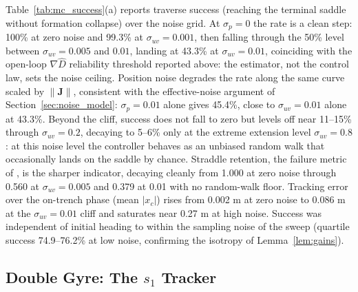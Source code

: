 \documentclass[lettersize,journal]{IEEEtran}
\begin{document}
Table~\ref{tab:mc_success}(a) reports traverse success (reaching the
terminal saddle without formation collapse) over the noise grid. At
$\sigma_p = 0$ the rate is a clean step: 100\% at zero noise and
99.3\% at $\sigma_{uv} = 0.001$, then falling through the 50\% level between
$\sigma_{uv} = 0.005$ and $0.01$, landing at 43.3\% at
$\sigma_{uv} = 0.01$, coinciding with the open-loop $\nabla\hat{D}$
reliability threshold reported above: the estimator, not the control
law, sets the noise ceiling. Position noise degrades the rate along the same curve scaled
by $\|\mathbf{J}\|$, consistent with the effective-noise argument of
Section~\ref{sec:noise_model}: $\sigma_p = 0.01$ alone gives 45.4\%,
close to $\sigma_{uv} = 0.01$ alone at 43.3\%. Beyond the cliff, success
does not fall to zero but levels off near 11--15\% through
$\sigma_{uv} = 0.2$, decaying to 5--6\% only at the extreme extension
level $\sigma_{uv} = 0.8$: at this noise level
the controller behaves as an unbiased random walk that occasionally
lands on the saddle by chance. Straddle retention, the failure metric
of \cite{9}, is the sharper indicator, decaying cleanly from 1.000 at
zero noise through 0.560 at $\sigma_{uv} = 0.005$ and 0.379 at 0.01
with no random-walk floor. Tracking
error over the on-trench phase (mean $|x_c|$) rises from 0.002 m at zero
noise to 0.086 m at the $\sigma_{uv} = 0.01$ cliff and saturates near
0.27 m at high noise. Success was independent of initial heading to
within the sampling noise of the sweep (quartile success 74.9--76.2\%
at low noise, confirming the isotropy of Lemma~\ref{lem:gains}).

\subsection{Double Gyre: The $s_1$ Tracker}
\label{sec:results_oecs}

\end{document}
